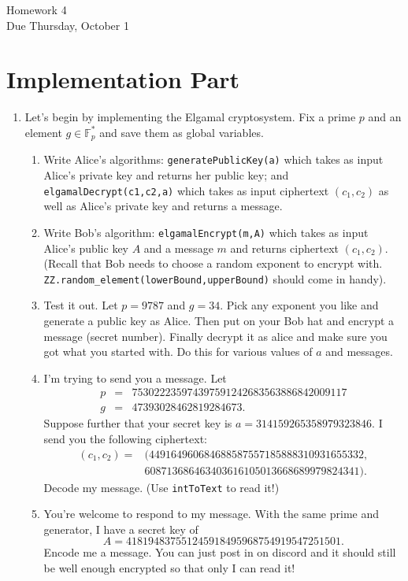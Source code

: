 \documentclass[11pt]{article}
\newcommand{\bF}{\mathbb{F}}
\begin{document}
\begin{center}
\Large {Homework 4}\\
\small {Due Thursday, October 1}
\end{center}
\section*{Implementation Part}
\begin{enumerate}
  \item{
  Let's begin by implementing the Elgamal cryptosystem.  Fix a prime $p$ and an element $g\in\bF_p^*$ and save them as global variables.
  \begin{enumerate}
    \item{
    Write Alice's algorithms: \verb|generatePublicKey(a)| which takes as input Alice's private key and returns her public key; and \verb|elgamalDecrypt(c1,c2,a)| which takes as input ciphertext $(c_1,c_2)$ as well as Alice's private key and returns a message.
    }
    \item{
    Write Bob's algorithm: \verb|elgamalEncrypt(m,A)| which takes as input Alice's public key $A$ and a message $m$ and returns ciphertext $(c_1,c_2)$.  (Recall that Bob needs to choose a random exponent to encrypt with.  \verb|ZZ.random_element(lowerBound,upperBound)| should come in handy).
    }
    \item{
    Test it out.  Let $p=9787$ and $g=34$.  Pick any exponent you like and generate a public key as Alice.  Then put on your Bob hat and encrypt a message (secret number).  Finally decrypt it as alice and make sure you got what you started with.  Do this for various values of $a$ and messages.
    }
    \item{
    I'm trying to send you a message.  Let
    \begin{eqnarray*}
      p&=&753022235974397591242683563886842009117\\
      g&=&47393028462819284673.
    \end{eqnarray*}
    Suppose further that your secret key is $a=314159265358979323846$.  I send you the following ciphertext:
    \begin{eqnarray*}(c_1,c_2) =& (449164960684688587557185888310931655332,\\
      &608713686463403616105013668689979824341).
    \end{eqnarray*}
    Decode my message. (Use \verb|intToText| to read it!)
    }
    \item{
    You're welcome to respond to my message.  With the same prime and generator, I have a secret key of
    \[A = 418194837551245918495968754919547251501.\]
    Encode me a message.  You can just post in on discord and it should still be well enough encrypted so that only I can read it!
    }
  \end{enumerate}
  }
\end{enumerate}
\end{document}
